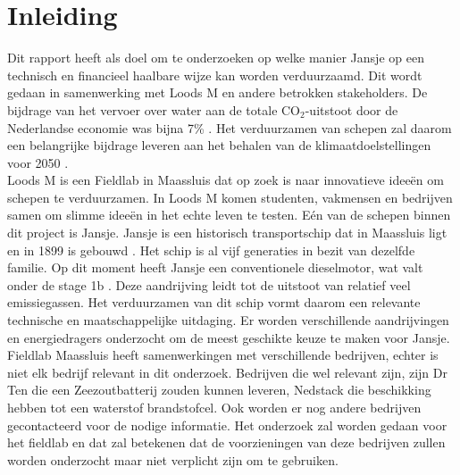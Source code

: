 \chapter{Inleiding}

 Dit rapport heeft als doel om te onderzoeken op welke manier Jansje op een technisch en financieel haalbare wijze  kan worden verduurzaamd. Dit wordt gedaan in samenwerking met Loods M en andere betrokken stakeholders. De bijdrage van het vervoer over water aan de totale CO$_2$-uitstoot door de Nederlandse economie was bijna 7\% \cite{cbs_water_uitstoot}. Het verduurzamen van schepen zal daarom een belangrijke bijdrage leveren aan het behalen van de klimaatdoelstellingen voor 2050 \cite{imo_ghg_emissions}. \\

\noindent
Loods M is een Fieldlab in Maassluis dat op zoek is naar innovatieve ideeën om schepen te verduurzamen. In Loods M komen studenten, vakmensen en bedrijven samen om slimme ideeën in het echte leven te testen. Eén van de schepen binnen dit project is Jansje. Jansje is een historisch transportschip dat in Maassluis ligt en in 1899 is gebouwd \cite{Jansje}. Het schip is al vijf generaties in bezit van dezelfde familie. Op dit moment heeft Jansje een conventionele dieselmotor, wat valt onder de stage 1b \cite{dieselnet_eu_nonroad_standards}. Deze aandrijving leidt tot de uitstoot van relatief veel emissiegassen. Het verduurzamen van dit schip vormt daarom een relevante technische en maatschappelijke uitdaging. Er worden verschillende aandrijvingen en energiedragers onderzocht om de meest geschikte keuze te maken voor Jansje.\\


\noindent Fieldlab Maassluis heeft samenwerkingen met verschillende bedrijven, echter is niet elk bedrijf relevant in dit onderzoek. Bedrijven die wel relevant zijn, zijn Dr Ten \cite{drten_zeezout_batterij2} die een Zeezoutbatterij zouden kunnen leveren, Nedstack \cite{nedstack_pem_fuel_cell_stacks} die beschikking hebben tot een waterstof brandstofcel. Ook worden er nog andere bedrijven gecontacteerd voor de nodige informatie. Het onderzoek zal worden gedaan voor het fieldlab en dat zal betekenen dat de voorzieningen van deze bedrijven zullen worden onderzocht maar niet verplicht zijn om te gebruiken.


